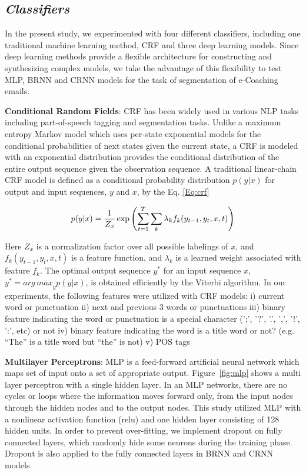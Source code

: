 \documentclass{amia}
\begin{document}
\subsection*{\textit{Classifiers}}

In the present study, we experimented with four different classifiers, including one traditional machine learning method, CRF and three deep learning models. Since deep learning methods provide a flexible architecture for constructing and synthesizing complex models, we take the advantage of this flexibility to test MLP, BRNN and CRNN models for the task of segmentation of e-Coaching emails.

\textbf{Conditional Random Fields}: CRF has been widely used in various NLP tasks including part-of-speech tagging and segmentation tasks.\cite{lafferty2001conditional, hirohata2008identifying} Unlike a maximum entropy Markov model which uses per-state exponential models for the conditional probabilities of next states given the current state, a CRF is modeled with an exponential distribution provides the conditional distribution of the entire output sequence given the observation sequence. A traditional linear-chain CRF model is defined as a conditional probability distribution $p(y|x)$ for output and input sequences, $y$ and $x$, by the Eq. \ref{Eq:crf}

\begin{equation}
\label{Eq:crf}
p(y|x) = \frac{1}{Z_x}\exp{\left(\sum_{t=1}^{T}\sum_{k}^{}\lambda_k f_k(y_{t-1}, y_t, x, t)\right)} \\
\end{equation}

Here $Z_x$ is a normalization factor over all possible labelings of $x$, and $f_k(y_{t-1}, y_t, x, t)$ is a feature function, and $\lambda_k$ is a learned weight associated with feature $f_k$. The optimal output sequence $y^*$ for an input sequence $x$, $y^* = {arg\,max}_y p(y|x)$, is obtained efficiently by the Viterbi algorithm. In our experiments, the following features were utilized with CRF models: i) current word or punctuation ii) next and previous 3 words or punctuations iii) binary feature indicating the word or punctuation is a special character (';', '?', '.', ',', '!', ':', etc) or not iv) binary feature indicating the word is a title word or not? (e.g. ``The'' is a title word but ``the'' is not) v) POS tags   

\textbf{Multilayer Perceptrons}: MLP is a feed-forward artificial neural network which maps set of input onto a set of appropriate output.\cite{rumelhart1986learning} Figure~\ref{fig:mlp} shows a multi layer perceptron with a single hidden layer. In an MLP networks, there are no cycles or loops where the information moves forward only, from the input nodes through the hidden nodes and to the output nodes. This study utilized MLP with a nonlinear activation function (relu) and one hidden layer consisting of 128 hidden units. In order to prevent over-fitting, we implement dropout on fully connected layers, which randomly hide some neurons during the training phase. \cite{srivastava2014dropout} Dropout is also applied to the fully connected layers in BRNN and CRNN models. 
\end{document}
